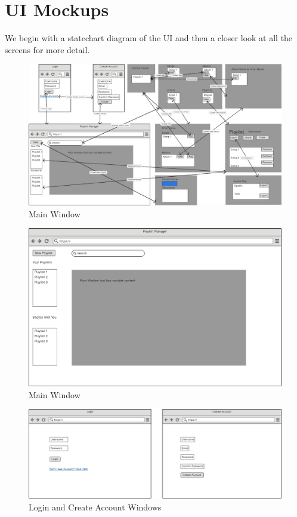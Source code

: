 \documentclass[12pt]{article}
\begin{document}
	\section{UI Mockups}
	We begin with a statechart diagram of the UI and then a closer look at all the screens for more detail. 
		\begin{figure}[H]
		\centering
		\includegraphics[scale=0.3]{StatechartDiagram.png}
		\caption{Main Window}
		\label{fig:statechart}
	\end{figure}
	\begin{figure}[H]
		\centering
		\includegraphics[scale=0.4]{GenericMainWindow}
		\caption{Main Window}
		\label{fig:gmw}
	\end{figure}
	\begin{figure}[H]
		\centering
		\includegraphics[scale=0.35]{CreateAccount.png}
		\caption{Login and Create Account Windows}
		\label{fig:login}
	\end{figure}
\end{document}
